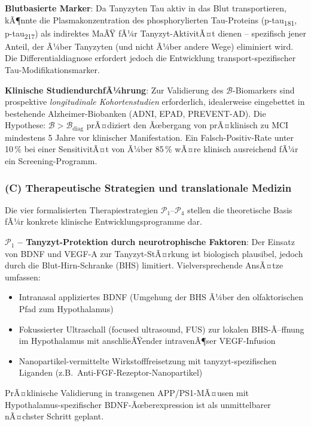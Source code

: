 ﻿\documentclass[12pt,a4paper]{article}
\theoremstyle{definition}
\begin{document}
	\textbf{Blutbasierte Marker}: Da Tanyzyten Tau aktiv in das Blut transportieren, kÃ¶nnte die Plasmakonzentration des phosphorylierten Tau-Proteins (p-tau\textsubscript{181}, p-tau\textsubscript{217}) als indirektes MaÃŸ fÃ¼r Tanyzyt-AktivitÃ¤t dienen -- spezifisch jener Anteil, der Ã¼ber Tanyzyten (und nicht Ã¼ber andere Wege) eliminiert wird. Die Differentialdiagnose erfordert jedoch die Entwicklung transport-spezifischer Tau-Modifikationsmarker.

	\textbf{Klinische StudiendurchfÃ¼hrung}: Zur Validierung des $\mathcal{B}$-Biomarkers sind prospektive \emph{longitudinale Kohortenstudien} erforderlich, idealerweise eingebettet in bestehende Alzheimer-Biobanken (ADNI, EPAD, PREVENT-AD). Die Hypothese: $\mathcal{B} > \mathcal{B}_{\text{diag}}$ prÃ¤diziert den Ãœbergang von prÃ¤klinisch zu MCI mindestens 5 Jahre vor klinischer Manifestation. Ein Falsch-Positiv-Rate unter 10\,\% bei einer SensitivitÃ¤t von Ã¼ber 85\,\% wÃ¤re klinisch ausreichend fÃ¼r ein Screening-Programm.

	\subsubsection*{(C) Therapeutische Strategien und translationale Medizin}

	Die vier formalisierten Therapiestrategien $\mathcal{P}_1$--$\mathcal{P}_4$ stellen die theoretische Basis fÃ¼r konkrete klinische Entwicklungsprogramme dar.

	\textbf{$\mathcal{P}_1$ -- Tanyzyt-Protektion durch neurotrophische Faktoren}: Der Einsatz von BDNF und VEGF-A zur Tanyzyt-StÃ¤rkung ist biologisch plausibel, jedoch durch die Blut-Hirn-Schranke (BHS) limitiert. Vielversprechende AnsÃ¤tze umfassen:
	\begin{itemize}
		\item Intranasal appliziertes BDNF (Umgehung der BHS Ã¼ber den olfaktorischen Pfad zum Hypothalamus)
		\item Fokussierter Ultraschall (focused ultrasound, FUS) zur lokalen BHS-Ã–ffnung im Hypothalamus mit anschlieÃŸender intravenÃ¶ser VEGF-Infusion
		\item Nanopartikel-vermittelte Wirkstofffreisetzung mit tanyzyt-spezifischen Liganden (z.B.\ Anti-FGF-Rezeptor-Nanopartikel)
	\end{itemize}
	PrÃ¤klinische Validierung in transgenen APP/PS1-MÃ¤usen mit Hypothalamus-spezifischer BDNF-Ãœberexpression ist als unmittelbarer nÃ¤chster Schritt geplant.
\end{document}
